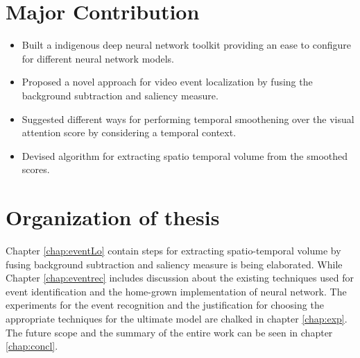 \section{Major Contribution}
\begin{itemize}
	\item{Built a indigenous deep neural network toolkit providing an ease to configure for different neural network models.}
	\item{Proposed a novel approach for video event localization by fusing the background subtraction and saliency measure.}
	\item{Suggested different ways for performing temporal smoothening over the visual attention score by considering a temporal context.}
	\item{Devised algorithm for extracting spatio temporal volume from the smoothed scores.}
\end{itemize}

\section{Organization of thesis}
\par Chapter \ref{chap:eventLo} contain steps for extracting spatio-temporal volume by fusing background subtraction and saliency measure is being elaborated.  While Chapter \ref{chap:eventrec} includes discussion about the existing techniques used for event identification and the home-grown implementation of neural network.  The experiments for the event recognition and the justification for choosing the appropriate techniques for the ultimate model are chalked in chapter \ref{chap:exp}.  The future scope and the summary of the entire work can be seen in chapter \ref{chap:concl}.